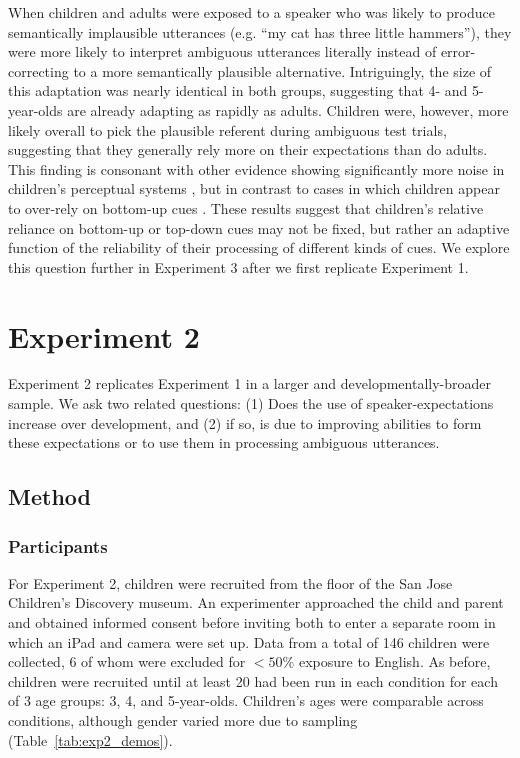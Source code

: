 \documentclass[man,floatsintext]{apa6}
\begin{document}
When children and adults were exposed to a speaker who was likely to produce semantically implausible utterances (e.g. ``my cat has three little hammers''), they were more likely to interpret ambiguous utterances literally instead of error-correcting to a more semantically plausible alternative. Intriguingly, the size of this adaptation was nearly identical in both groups, suggesting that 4- and 5-year-olds are already adapting as rapidly as adults. Children were, however, more likely overall to pick the plausible referent during ambiguous test trials, suggesting that they generally rely more on their expectations than do adults. This finding is consonant with other evidence showing significantly more noise in children's perceptual systems \cite{neuman1983}, but in contrast to cases in which children appear to over-rely on bottom-up cues \cite{snedeker2004, trueswell1999}. These results suggest that children's relative reliance on bottom-up or top-down cues may not be fixed, but rather an adaptive function of the reliability of their processing of different kinds of cues. We explore this question further in Experiment 3 after we first replicate Experiment 1.

\section{Experiment 2}

Experiment 2 replicates Experiment 1 in a larger and developmentally-broader sample. We ask two related questions: (1) Does the use of speaker-expectations increase over development, and (2) if so, is due to improving abilities to form these expectations or to use them in processing ambiguous utterances.

\subsection{Method}

\subsubsection{Participants}

For Experiment 2, children were recruited from the floor of the San Jose Children's Discovery museum. An experimenter approached the child and parent and obtained informed consent before inviting both to enter a separate room in which an iPad and camera were set up. Data from a total of 146 children were collected, 6 of whom were excluded for $<50\%$ exposure to English. As before, children were recruited until at least 20 had been run in each condition for each of 3 age groups: 3, 4, and 5-year-olds. Children's ages were comparable across conditions, although gender varied more due to sampling (Table~\ref{tab:exp2_demos}).
\end{document}
